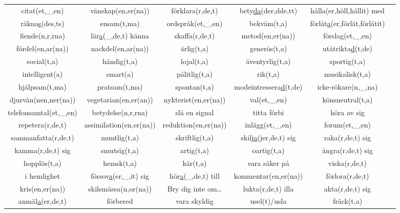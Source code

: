 \begin{center}
    \begin{adjustwidth}{-2.8cm}{}
        \begin{tabular}{|c c c c c c|}
            \hline
            citat(et,\_,en) & vänskap(en,er(na)) & förklara(r,de,t) & bety\underline{da}(der,dde,tt) & hålla(er,höll,hållit) med &  \\
            räkna\underline{s}(des,ts) & ensam(t,ma) & ordspråk(et,\_,en) & bekväm(t,a) & förlåt\underline{a}(er,förlät,förlåtit) &  \\
            fiende(n,r,rna) & lär\underline{a}(\_,de,t) känna & skaffa(r,de,t) & metod(en,er(na)) & förslag(et,\_,en) &  \\
            fördel(en,ar(na)) & nackdel(en,ar(na)) & ärlig(t,a) & generös(t,a) & utåtrikta\underline{d}(t,de) &  \\
            social(t,a) & händig(t,a) & lojal(t,a) & äventyrlig(t,a) & sportig(t,a) &  \\
            intelligent(a) & smart(a) & pålitlig(t,a) & rik(t,a) & musikalisk(t,a) &  \\
            hjälpsam(t,ma) & pratsam(t,ma) & spontan(t,a) & modeintressera\underline{d}(t,de) & icke-rökare(n,\_,na) &  \\
            djurvän(nen,ner(na)) & vegetarian(en,er(an)) & nykterist(en,er(na)) & val(et,\_,en) & könsneutral(t,a) &  \\
            telefonsamtal(et,\_,en) & betydelse(n,r,rna) & slå en signal & titta förbi & höra av sig &  \\
            repetera(r,de,t) & assimilation(en,er(na)) & reduktion(en,er(na)) & inlägg(et,\_,en) & forum(et,\_,en) &  \\
            sammanfatta(r,de,t) & muntlig(t,a) & skriftlig(t,a) & skil\underline{ja}(jer,de,t) sig & raka(r,de,t) sig &  \\
            kamma(r,de,t) sig & smutsig(t,a) & artig(t,a) & oartig(t,a) & ångra(r,de,t) sig &  \\
            hopplös(t,a) & hemsk(t,a) & kär(t,a) & vara säker på & viska(r,de,t) &  \\
            i hemlighet & försov\underline{a}(er,\_,it) sig & hör\underline{a}(\_,de,t) till & kommentar(en,er(na)) & förlora(r,de,t) &  \\
            kris(en,er(na)) & skilsmässa(n,or(na)) & Bry dig inte om\ldots & lukta(r,de,t) illa & akta(r,de,t) sig &  \\
            anmäl\underline{a}(er,de,t) & förbered & vara skyldig & usel(t)/usla & fräck(t,a) &  \\

\end{tabular}
\end{adjustwidth}
\end{center}
